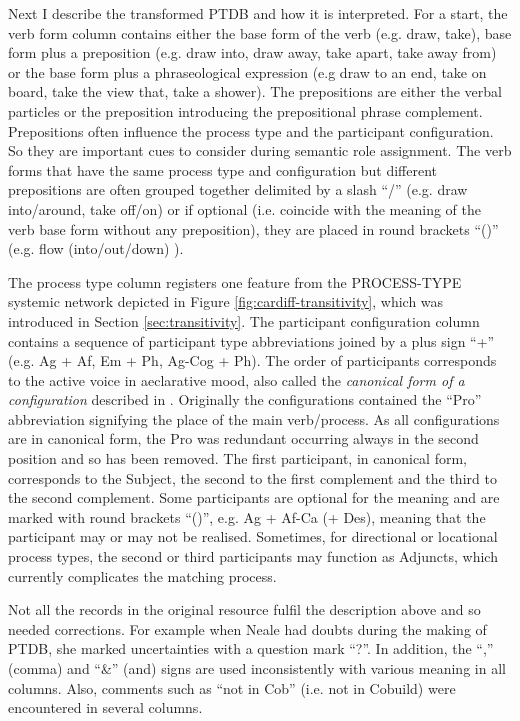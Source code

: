     Next I describe the transformed PTDB and how it is interpreted. For a start, the verb form column contains either the base form of the verb (e.g. draw, take), base form plus a preposition (e.g. draw into, draw away, take apart, take away from) or the base form plus a phraseological expression (e.g draw to an end, take on board, take the view that, take a shower). The prepositions are either the verbal particles or the preposition introducing the prepositional phrase complement. Prepositions often influence the process type and the participant configuration. So they are important cues to consider during semantic role assignment. The verb forms that have the same process type and configuration but different prepositions are often grouped together delimited by a slash ``/'' (e.g. draw into/around, take off/on) or if optional (i.e. coincide with the meaning of the verb base form without any preposition), they are placed in round brackets ``()'' (e.g. flow (into/out/down) ).

    The process type column registers one feature from the PROCESS-TYPE systemic network depicted in Figure \ref{fig:cardiff-transitivity}, which was introduced in Section \ref{sec:transitivity}. The participant configuration column contains a sequence of participant type abbreviations joined by a plus sign ``+'' (e.g. Ag + Af, Em + Ph, Ag-Cog + Ph). The order of participants corresponds to the active voice in aeclarative mood, also called the \textit{canonical form of a configuration} described in \citet{Fawcett2009}. Originally the configurations contained the ``Pro'' abbreviation signifying the place of the main verb/process. As all configurations are in canonical form, the Pro was redundant occurring always in the second position and so has been removed. The first participant, in canonical form, corresponds to the Subject, the second to the first complement and the third to the second complement. Some participants are optional for the meaning and are marked with round brackets ``()'', e.g. Ag + Af-Ca (+ Des), meaning that the participant may or may not be realised. Sometimes, for directional or locational process types, the second or third participants may function as Adjuncts, which currently complicates the matching process.

    Not all the records in the original resource fulfil the description above and so needed corrections. For example when Neale had doubts during the making of PTDB, she marked uncertainties with a question mark ``?''. In addition, the ``,'' (comma) and ``\&'' (and) signs are used inconsistently with various meaning in all columns. Also, comments such as ``not in Cob'' (i.e. not in Cobuild) were encountered in several columns.


